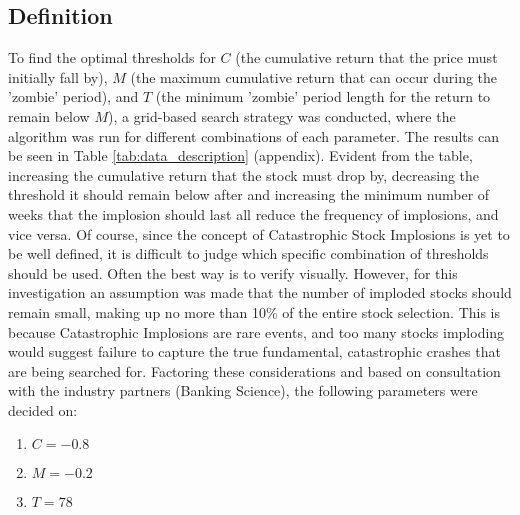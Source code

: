 \documentclass[a4paper]{report}
\begin{document}
\subsection{Definition}
To find the optimal thresholds for \(C\) (the cumulative return that the price must initially fall by), \(M\) (the maximum cumulative return that can occur during the 'zombie' period), and \(T\) (the minimum 'zombie' period length for the return to remain below \(M\)), a grid-based search strategy was conducted,
where the algorithm was run for different combinations of each parameter. The results can be seen in
Table \ref{tab:data_description} (appendix). Evident from the table, increasing the cumulative return that the stock must drop by, decreasing the threshold it should remain below after  and increasing the minimum number of weeks that the implosion should last 
all reduce the frequency of implosions, and vice versa. Of course, since the concept of Catastrophic Stock Implosions is yet to be well defined, it is difficult to judge which specific combination of thresholds should be used.
Often the best way is to verify visually. However, for this investigation an assumption was made that the number of imploded stocks should remain small, making up no more than 10\% of the entire stock selection. This is 
because Catastrophic Implosions are rare events, and too many stocks imploding would suggest failure to capture the true fundamental, catastrophic crashes that are being searched for. 
Factoring these considerations and based on consultation with the industry partners (Banking Science), the following parameters were decided on:
\begin{enumerate} 
  \item \(C = -0.8\)
  \item \(M = -0.2\)
  \item \(T = 78\)
\end{enumerate}
\end{document}
